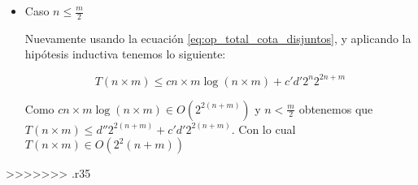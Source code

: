 \documentclass[a4paper, 12pt] {article}
\begin{document}
\begin{itemize}
\item Caso $n \leq \frac{m}{2}$

Nuevamente usando la ecuaci\'on \ref{eq:op_total_cota_disjuntos}, y aplicando la hip\'otesis inductiva tenemos lo siguiente: 

\begin{equation}
T\left( n \times m \right) \leq c n\times m \log \left(n\times m \right) + c'd' 2^{n}2^{2n+m}
\end{equation}


Como $ c n\times m \log \left(n\times m \right) \in O\left( 2^{2\left( n+m\right)}\right)$ y $ n < \frac{m}{2} $ obtenemos que $ T\left( n \times m \right) \leq d''2^{ 2\left( n+m \right)} + c'd' 2^{2\left(n+m \right)}$. Con lo cual $ T\left(n \times m \right) \in O\left(2^2\left( n+m\right) \right)$ 


\end{itemize}

>>>>>>> .r35
\end{document}

